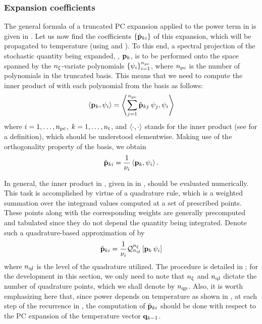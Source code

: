 \subsubsection{Expansion coefficients} 
The general formula of a truncated PC expansion applied to the power term in  is given in .
Let us now find the coefficients $\{ \hat{\mathbf{p}}_{ki} \}$ of this expansion, which will be propagated to temperature (using  and ).
To this end, a spectral projection of the stochastic quantity being expanded, \ie, $\mathbf{p}_k$, is to be performed onto the space spanned by the ${n_\xi}$-variate polynomials $\{ \psi_i \}_{i = 1}^{{n_\text{pc}}}$, where ${n_\text{pc}}$ is the number of polynomials in the truncated basis.
This means that we need to compute the inner product of  with each polynomial from the basis as follows:
\[
  \oInner{\vP_k}{\pcb_i} = \oInner{\sum_{j=1}^{\pcterms} \pcc{\vP}_{kj} \: \pcb_j}{\pcb_i}
\]
where $i = 1, \dotsc, {n_\text{pc}}$, $k = 1, \dotsc, {n_\text{t}}$, and $\oInner{\cdot}{\cdot}$ stands for the inner product (see  for a definition), which should be understood elementwise.
Making use of the orthogonality property of the basis, we obtain
\begin{equation} \elabel{pc-coefficients}
  \pcc{\vP}_{ki} = \frac{1}{\pcn_i} \oInner{\vP_k}{\pcb_i}.
\end{equation}

In general, the inner product in , given in  in , should be evaluated numerically.
This task is accomplished by virtue of a quadrature rule, which is a weighted summation over the integrand values computed at a set of prescribed points.
These points along with the corresponding weights are generally precomputed and tabulated since they do not depend the quantity being integrated.
Denote such a quadrature-based approximation of  by
\begin{equation} \elabel{pc-coefficients-quadrature}
  \pcc{\vP}_{ki} = \frac{1}{\pcn_i} \oQuad{\nvars}{\qdlevel}{\vP_k \, \pcb_i}
\end{equation}
where ${n_\text{ql}}$ is the level of the quadrature utilized.
The procedure is detailed in ; for the development in this section, we only need to note that ${n_\xi}$ and ${n_\text{ql}}$ dictate the number of quadrature points, which we shall denote by ${n_\text{qp}}$.
Also, it is worth emphasizing here that, since power depends on temperature as shown in , at each step of the recurrence in , the computation of $\hat{\mathbf{p}}_{ki}$ should be done with respect to the PC expansion of the temperature vector $\mathbf{q}_{k - 1}$.


